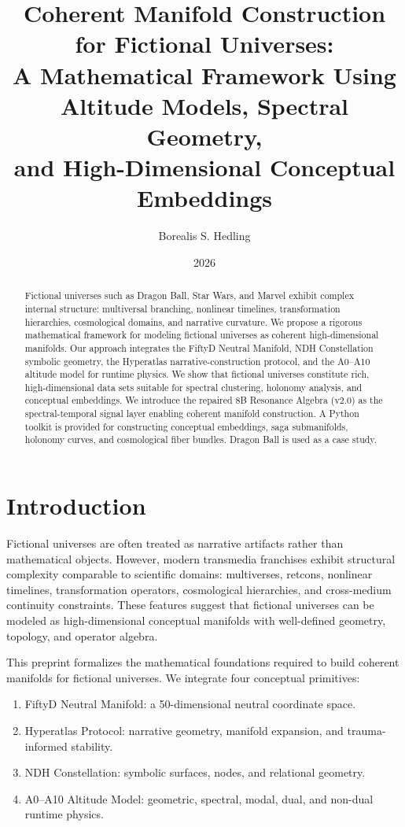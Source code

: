 \documentclass[11pt]{article}
\title{Coherent Manifold Construction for Fictional Universes:\\
A Mathematical Framework Using Altitude Models, Spectral Geometry,\\
and High-Dimensional Conceptual Embeddings}
\author{Borealis S. Hedling}
\date{2026}
\begin{document}
\maketitle

\begin{abstract}
Fictional universes such as Dragon Ball, Star Wars, and Marvel exhibit 
complex internal structure: multiversal branching, nonlinear timelines, 
transformation hierarchies, cosmological domains, and narrative curvature. 
We propose a rigorous mathematical framework for modeling fictional 
universes as coherent high-dimensional manifolds. Our approach integrates 
the FiftyD Neutral Manifold, NDH Constellation symbolic geometry, the 
Hyperatlas narrative-construction protocol, and the A0--A10 altitude model 
for runtime physics. We show that fictional universes constitute rich, 
high-dimensional data sets suitable for spectral clustering, holonomy 
analysis, and conceptual embeddings. We introduce the repaired 8B 
Resonance Algebra (v2.0) as the spectral-temporal signal layer enabling 
coherent manifold construction. A Python toolkit is provided for 
constructing conceptual embeddings, saga submanifolds, holonomy curves, 
and cosmological fiber bundles. Dragon Ball is used as a case study.
\end{abstract}

\section{Introduction}

Fictional universes are often treated as narrative artifacts rather than 
mathematical objects. However, modern transmedia franchises exhibit 
structural complexity comparable to scientific domains: multiverses, 
retcons, nonlinear timelines, transformation operators, cosmological 
hierarchies, and cross-medium continuity constraints. These features 
suggest that fictional universes can be modeled as high-dimensional 
conceptual manifolds with well-defined geometry, topology, and operator 
algebra.

This preprint formalizes the mathematical foundations required to build 
coherent manifolds for fictional universes. We integrate four conceptual 
primitives:

\begin{enumerate}
  \item FiftyD Neutral Manifold: a 50-dimensional neutral coordinate space.
  \item Hyperatlas Protocol: narrative geometry, manifold expansion, and 
        trauma-informed stability.
  \item NDH Constellation: symbolic surfaces, nodes, and relational geometry.
  \item A0--A10 Altitude Model: geometric, spectral, modal, dual, and 
        non-dual runtime physics.
\end{enumerate}
\end{document}
